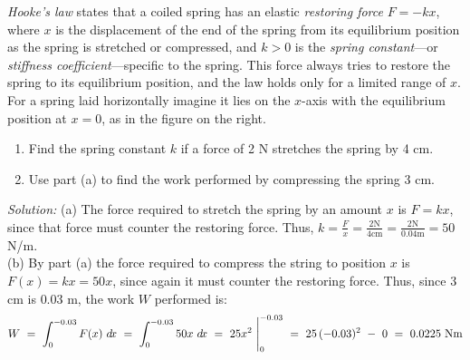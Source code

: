 \begin{exmp}
\noindent \emph{Hooke's law} states that a coiled spring has
an elastic \emph{restoring force} $F=-kx$, where $x$ is the displacement of the
end of the spring from its equilibrium position as the spring is stretched or
compressed, and $k>0$ is the \emph{spring constant}---or
\emph{stiffness coefficient}---specific to the spring. This force always tries
to restore the spring to its equilibrium position, and the law holds only for a
limited range of $x$. For a spring laid horizontally imagine it lies on the
$x$-axis with the equilibrium position at $x=0$, as in the figure on the right.
\begin{enumerate}[\bfseries (a)]
\item Find the spring constant $k$ if a force of 2 N stretches the spring by
4 cm.
\item Use part (a) to find the work performed by compressing the spring 3 cm.
\end{enumerate}


\par\noindent\emph{Solution:} (a) The force required to stretch the spring by an
amount $x$ is $F=kx$, since that force must counter the restoring force. Thus,
$k=\frac{F}{x}=\frac{2 \text{N}}{4 \text{cm}}=\frac{2 \text{N}}{0.04 \text{m}}=
50$ N/m.\\
(b) By part (a) the force required to compress the string to position $x$ is
$F(x)=kx=50x$, since again it must counter the restoring force. Thus, since
$3$ cm is $0.03$ m, the work $W$ performed is:
\[
W ~=~ \int_0^{-0.03} F(x)~d\!x ~=~ \int_0^{-0.03} 50x~d\!x ~=~ 25x^2~\Biggr|_0^{-0.03}
~=~ 25\,(-0.03)^2 ~-~ 0 ~=~ 0.0225~\text{Nm}
\]
\end{exmp}
\divider
\newpage
{}\\

